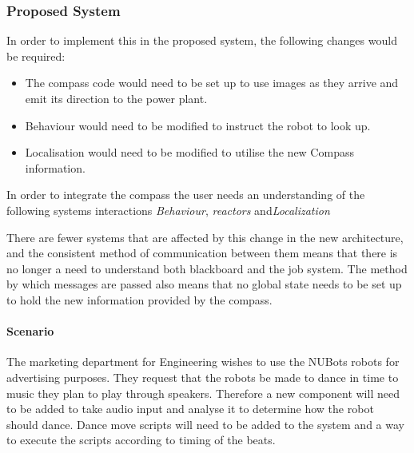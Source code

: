 \documentclass[english,12pt]{scrartcl}
\begin{document}
			\subsubsection{Proposed System}
				In order to implement this in the proposed system, the following changes would be required:
				\begin{itemize}
					\item The compass code would need to be set up to use images as they arrive and emit its direction to the power plant.
					\item Behaviour would need to be modified to instruct the robot to look up.
					\item Localisation would need to be modified to utilise the new Compass information.
				\end{itemize}
				
				In order to integrate the compass the user needs an understanding of the following systems interactions \emph{Behaviour}, \emph{\glspl{reactor}} and\emph{Localization}
				
				There are fewer systems that are affected by this change in the new architecture, and the consistent method of communication between them means that there is no longer a need to understand both blackboard and the job system.
				The method by which messages are passed also means that no global state needs to be set up to hold the new information provided by the compass.

			\paragraph{Scenario} The marketing department for Engineering wishes to use the NUBots robots for advertising purposes. They request that the robots be made to dance in time to music they plan to play through speakers. Therefore a new component will need to be added to take audio input and analyse it to determine how the robot should dance. Dance move scripts will need to be added to the system and a way to execute the scripts according to timing of the beats.
\end{document}
